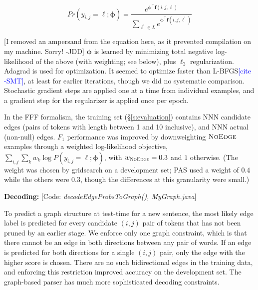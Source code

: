 \documentclass[11pt]{article}
\newcommand{\bocomment}[1]{\textcolor{Bittersweet}{[#1 -BTO]}}
\newcommand{\sam}[1]{\textcolor{blue}{[#1 -SMT]}}
\newcommand{\jdcomment}[1]{\textcolor{NavyBlue}{[#1 -JDD]}}
\newcommand{\codenote}[1]{\textcolor{PineGreen}{[Code: \emph{#1}]}}
\newcommand{\noedge}{\textsc{NoEdge}}
\begin{document}
\begin{equation}
  Pr(y_{i,j}=\ell; \bm\phi)  = \frac{
  	e^{\bm\phi^\top \bm{f}(i, j, \ell)}
  } {
  	\sum_{\ell^\prime \in L} {
  		e^{\bm\phi^\top \bm{f}(i, j, \ell^\prime)}
  	}
  }
\end{equation}

\noindent
\jdcomment{I removed an ampersand from the equation here, as it prevented compilation on my machine. Sorry!}
$\bm\phi$ is learned by minimizing total negative log-likelihood of the above
(with weighting; see below), plus $\ell_2$ regularization.
Adagrad \cite{duchi_adaptive_2011} is used for optimization.
It seemed to optimize faster than L-BFGS\sam{cite}, at least for earlier
iterations, though we did no systematic comparison. Stochastic gradient steps are applied one at a time from individual examples, and a gradient step for the regularizer is applied once per epoch.

In the FFF formalism, the training set (\S\ref{s:evaluation})
contains NNN candidate edges (pairs of tokens with length between 1 and 10 inclusive),
and NNN actual (non-null) edges.  $F_1$ performance was improved by
downweighting $\noedge$ examples through a weighted log-likelihood objective,
$\sum_{i,j} \sum_k w_k \log P(y_{i,j}=\ell; \bm\phi)$, with $w_{\noedge}=0.3$
and $1$ otherwise.
(The weight was chosen by gridsearch on a development set; 
PAS used a weight of $0.4$ while the others were $0.3$, though the differences at this granularity were small.)



\textbf{Decoding:}
\codenote{decodeEdgeProbsToGraph(), MyGraph.java}

To predict a graph structure at test-time for a new sentence,
the most likely edge label is predicted for every candidate $(i, j)$ pair of
tokens that has not been pruned by an earlier stage.
We enforce only one graph constraint, which is that there cannot be
an edge in both directions between any pair of words.
If an edge is predicted for both directions for a single $(i, j)$
pair, only the edge with the higher score is chosen.
There are no such bidirectional edges in the training data, and enforcing this
restriction improved accuracy on the development set.
The graph-based parser has much more sophisticated decoding constraints.
\end{document}
